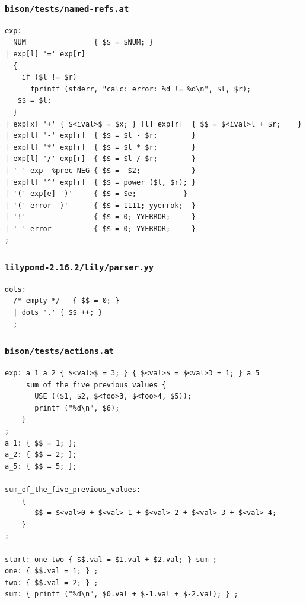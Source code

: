 \documentclass{beamer}
\begin{document}
\begin{frame}[fragile,shrink=25]
  \frametitle{\texttt{bison/tests/named-refs.at}}
\begin{verbatim}
exp:
  NUM                { $$ = $NUM; }
| exp[l] '=' exp[r]
  {
    if ($l != $r)
      fprintf (stderr, "calc: error: %d != %d\n", $l, $r);
   $$ = $l;
  }
| exp[x] '+' { $<ival>$ = $x; } [l] exp[r]  { $$ = $<ival>l + $r;    }
| exp[l] '-' exp[r]  { $$ = $l - $r;        }
| exp[l] '*' exp[r]  { $$ = $l * $r;        }
| exp[l] '/' exp[r]  { $$ = $l / $r;        }
| '-' exp  %prec NEG { $$ = -$2;            }
| exp[l] '^' exp[r]  { $$ = power ($l, $r); }
| '(' exp[e] ')'     { $$ = $e;           }
| '(' error ')'      { $$ = 1111; yyerrok;  }
| '!'                { $$ = 0; YYERROR;     }
| '-' error          { $$ = 0; YYERROR;     }
;
\end{verbatim}
\end{frame}

\begin{frame}[fragile,shrink=25]
  \frametitle{\texttt{lilypond-2.16.2/lily/parser.yy}}
\begin{verbatim}
dots:
  /* empty */   { $$ = 0; }
  | dots '.' { $$ ++; }
  ;
\end{verbatim}
\end{frame}

\begin{frame}[fragile,shrink=25]
  \frametitle{\texttt{bison/tests/actions.at}}
\begin{verbatim}
exp: a_1 a_2 { $<val>$ = 3; } { $<val>$ = $<val>3 + 1; } a_5
     sum_of_the_five_previous_values {
       USE (($1, $2, $<foo>3, $<foo>4, $5));
       printf ("%d\n", $6);
    }
;
a_1: { $$ = 1; };
a_2: { $$ = 2; };
a_5: { $$ = 5; };

sum_of_the_five_previous_values:
    {
       $$ = $<val>0 + $<val>-1 + $<val>-2 + $<val>-3 + $<val>-4;
    }
;

start: one two { $$.val = $1.val + $2.val; } sum ;
one: { $$.val = 1; } ;
two: { $$.val = 2; } ;
sum: { printf ("%d\n", $0.val + $-1.val + $-2.val); } ;
\end{verbatim}
\end{frame}
\end{document}
